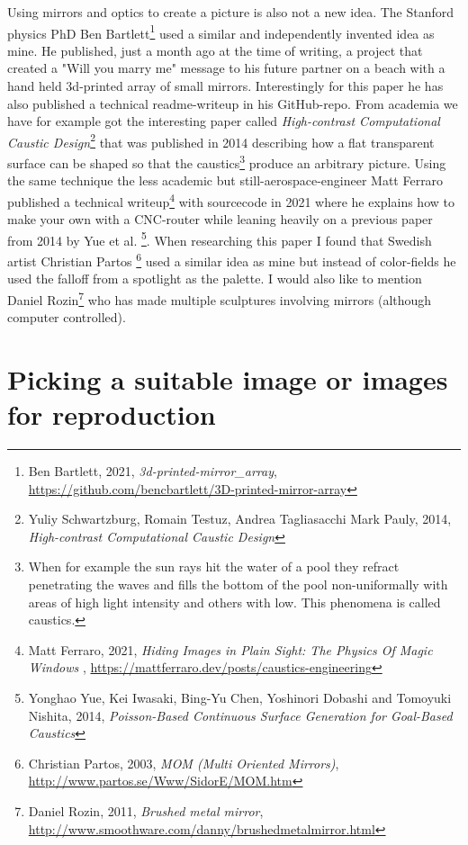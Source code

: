 \documentclass{article}
\begin{document}
Using mirrors and optics to create a picture is also not a new idea. The
Stanford physics PhD Ben Bartlett\footnote{Ben Bartlett, 2021,
  \emph{3d-printed-mirror\_array},
  \url{https://github.com/bencbartlett/3D-printed-mirror-array}} used a
similar and independently invented idea as mine. He published, just a month ago at the time of writing, a
project that created a "Will you marry me" message to his future partner on a beach
with a hand held 3d-printed array of small mirrors. Interestingly for
this paper he has also published a technical readme-writeup in his
GitHub-repo. From academia we have for example got the interesting paper
called \emph{High-contrast Computational Caustic Design}\footnote{Yuliy
  Schwartzburg, Romain Testuz, Andrea Tagliasacchi Mark Pauly, 2014,
  \emph{High-contrast Computational Caustic Design}} that was published
in 2014 describing how a flat transparent surface can be shaped so that
the caustics\footnote{When for example the sun rays hit the water of a
  pool they refract penetrating the waves and fills the bottom of the
  pool non-uniformally with areas of high light intensity and others
  with low. This phenomena is called caustics.} produce an arbitrary
picture. Using the same technique the less academic but
still-aerospace-engineer Matt Ferraro published a technical
writeup\footnote{Matt Ferraro, 2021, \emph{Hiding Images in Plain Sight:
  The Physics Of Magic Windows} ,
  \url{https://mattferraro.dev/posts/caustics-engineering}} with
sourcecode in 2021 where he explains how to make your own with a
CNC-router while leaning heavily on a previous paper from 2014 by Yue et
al. \footnote{Yonghao Yue, Kei Iwasaki, Bing-Yu Chen, Yoshinori Dobashi
  and Tomoyuki Nishita, 2014, \emph{Poisson-Based Continuous Surface
  Generation for Goal-Based Caustics}}. When researching this paper I
found that Swedish artist Christian Partos \footnote{Christian Partos,
  2003, \emph{MOM (Multi Oriented Mirrors)},
  \url{http://www.partos.se/Www/SidorE/MOM.htm}} used a similar idea as
mine but instead of color-fields he used the falloff from a spotlight
as the palette. I would also like to mention Daniel Rozin\footnote{Daniel
  Rozin, 2011, \emph{Brushed metal mirror},
  \url{http://www.smoothware.com/danny/brushedmetalmirror.html}} who has
made multiple sculptures involving mirrors (although computer
controlled).

\section{Picking a suitable image or images for
reproduction}
\end{document}

